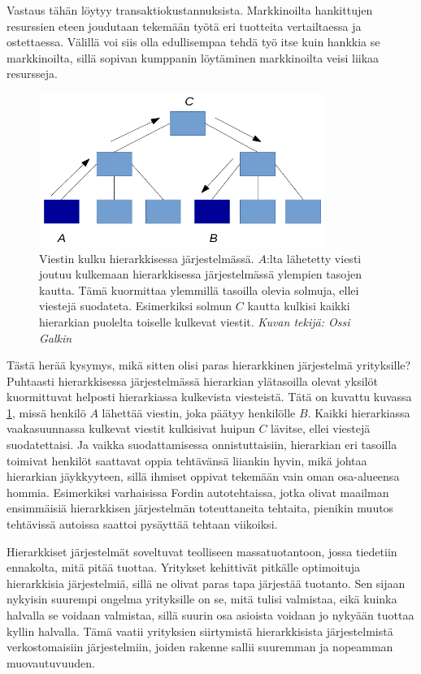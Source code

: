 \documentclass[finnish,12pt,a4paper,pdftex,elec,utf8]{aaltothesis}
\begin{document}
Vastaus tähän löytyy transaktiokustannuksista. Markkinoilta hankittujen resurssien eteen joudutaan tekemään työtä eri tuotteita vertailtaessa ja ostettaessa. Välillä voi siis olla edullisempaa tehdä työ itse kuin hankkia se markkinoilta, sillä sopivan kumppanin löytäminen markkinoilta veisi liikaa resursseja.


\begin{figure}[htb]
\centering \includegraphics[height=5cm]{Hierarkia_1}
\caption{Viestin kulku hierarkkisessa järjestelmässä. $A$:lta lähetetty viesti joutuu kulkemaan hierarkkisessa järjestelmässä ylempien tasojen kautta. Tämä kuormittaa ylemmillä tasoilla olevia solmuja, ellei viestejä suodateta. Esimerkiksi solmun $C$ kautta kulkisi kaikki hierarkian puolelta toiselle kulkevat viestit. \textit{Kuvan tekijä: Ossi Galkin} \label{fig:Hierarkia_1}}
\end{figure}

Tästä herää kysymys, mikä sitten olisi paras hierarkkinen järjestelmä yrityksille? Puhtaasti hierarkkisessa järjestelmässä hierarkian ylätasoilla olevat yksilöt kuormittuvat helposti hierarkiassa kulkevista viesteistä. Tätä on kuvattu kuvassa \ref{fig:Hierarkia_1}, missä henkilö $A$ lähettää viestin, joka päätyy henkilölle $B$. Kaikki hierarkiassa vaakasuunnassa kulkevat viestit kulkisivat huipun $C$ lävitse, ellei viestejä suodatettaisi. Ja vaikka suodattamisessa onnistuttaisiin, hierarkian eri tasoilla toimivat henkilöt saattavat oppia tehtävänsä liiankin hyvin, mikä johtaa hierarkian jäykkyyteen, sillä ihmiset oppivat tekemään vain oman osa-alueensa hommia. Esimerkiksi varhaisissa Fordin autotehtaissa, jotka olivat maailman ensimmäisiä hierarkkisen järjestelmän toteuttaneita tehtaita, pienikin muutos tehtävissä autoissa saattoi pysäyttää tehtaan viikoiksi. \cite[194]{Linkit}

Hierarkkiset järjestelmät soveltuvat teolliseen massatuotantoon, jossa tiedetiin ennakolta, mitä pitää tuottaa. Yritykset kehittivät pitkälle optimoituja hierarkkisia järjestelmiä, sillä ne olivat paras tapa järjestää tuotanto. Sen sijaan nykyisin suurempi ongelma yrityksille on se, mitä tulisi valmistaa, eikä kuinka halvalla se voidaan valmistaa, sillä suurin osa asioista voidaan jo nykyään tuottaa kyllin halvalla. Tämä vaatii yrityksien siirtymistä hierarkkisista järjestelmistä verkostomaisiin järjestelmiin, joiden rakenne sallii suuremman ja nopeamman muovautuvuuden. \cite[195]{Linkit}
\end{document}
